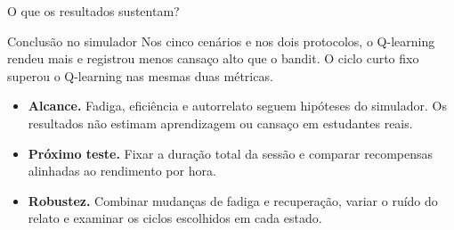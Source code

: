 \documentclass[aspectratio=169]{beamer}
\begin{document}
\begin{frame}{O que os resultados sustentam?}
\begin{alertblock}{Conclusão no simulador}
Nos cinco cenários e nos dois protocolos, o Q-learning rendeu mais e registrou menos cansaço alto que o bandit. O ciclo curto fixo superou o Q-learning nas mesmas duas métricas.
\end{alertblock}
\begin{itemize}
\item \textbf{Alcance.} Fadiga, eficiência e autorrelato seguem hipóteses do simulador. Os resultados não estimam aprendizagem ou cansaço em estudantes reais.
\item \textbf{Próximo teste.} Fixar a duração total da sessão e comparar recompensas alinhadas ao rendimento por hora.
\item \textbf{Robustez.} Combinar mudanças de fadiga e recuperação, variar o ruído do relato e examinar os ciclos escolhidos em cada estado.
\end{itemize}
\end{frame}
\end{document}
